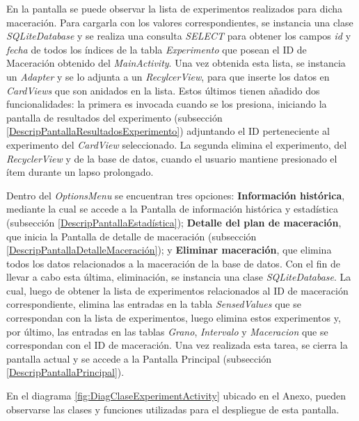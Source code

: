                 \par En la pantalla se puede observar la lista de experimentos realizados para dicha maceración. Para cargarla con los valores correspondientes, se instancia una clase \textit{SQLiteDatabase} y se realiza una consulta \textit{SELECT} para obtener los campos \textit{id} y \textit{fecha} de todos los índices de la tabla \textit{Experimento} que posean el ID de Maceración obtenido del \textit{MainActivity}. Una vez obtenida esta lista, se instancia un \textit{Adapter} y se lo adjunta a un \textit{RecylcerView}, para que inserte los datos en \textit{CardViews} que son anidados en la lista. Estos últimos tienen añadido dos funcionalidades: la primera es invocada cuando se los presiona, iniciando la pantalla de resultados del experimento (subsección \ref{DescripPantallaResultadosExperimento}) adjuntando el ID perteneciente al experimento del \textit{CardView} seleccionado. La segunda elimina el experimento, del \textit{RecyclerView} y de la base de datos, cuando el usuario mantiene presionado el ítem durante un lapso prolongado.
                
                \par Dentro del \textit{OptionsMenu} se encuentran tres opciones: \textbf{Información histórica}, mediante la cual se accede a la Pantalla de información histórica y estadística (subsección \ref{DescripPantallaEstadística}); \textbf{Detalle del plan de maceración}, que inicia la Pantalla de detalle de maceración (subsección \ref{DescripPantallaDetalleMaceración}); y \textbf{ Eliminar maceración}, que elimina todos los datos relacionados a la maceración de la base de datos. Con el fin de llevar a cabo esta última, eliminación, se instancia una clase \textit{SQLiteDatabase}. La cual, luego de obtener la lista de experimentos relacionados al ID de maceración correspondiente, elimina las entradas en la tabla \textit{SensedValues} que se correspondan con la lista de experimentos, luego elimina estos experimentos y, por último, las entradas en las tablas \textit{Grano}, \textit{Intervalo} y \textit{Maceracion} que se correspondan con el ID de maceración. Una vez realizada esta tarea, se cierra la pantalla actual y se accede a la Pantalla Principal (subsección \ref{DescripPantallaPrincipal}).
                
                \par En el diagrama \ref{fig:DiagClaseExperimentActivity} ubicado en el Anexo, pueden observarse las clases y funciones utilizadas para el despliegue de esta pantalla.
            
